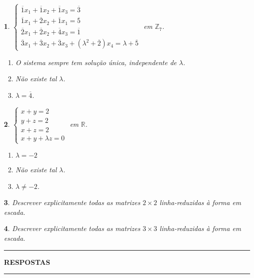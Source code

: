 \documentclass[12pt]{exam}
\newtheorem{exercicio}{}
\newcommand{\integer}{\mathbb{Z}}
\newcommand{\real}{\mathbb{R}}
\begin{document}
\begin{exercicio}
$\begin{cases}
  \overline{1}x_1 + \overline{1}x_2 + \overline{1}x_3 = \overline{3}\\
  \overline{1}x_1 + \overline{2}x_2 + \overline{1}x_1 = \overline{5}\\
  \overline{2}x_1 + \overline{2}x_2 + \overline{4}x_3 = \overline{1}\\
  \overline{3}x_1 + \overline{3}x_2 + \overline{3}x_3 + (\lambda^2 + \overline{2})x_4 = \lambda + \overline{5}
\end{cases}$ em $\integer_7$.
\begin{solucao}
  \begin{enumerate}[label={\alph*})]
    \item O sistema sempre tem solu\c{c}\~ao \'unica, independente de $\lambda$.
    \item N\~ao existe tal $\lambda$.
    \item $\lambda = \overline{4}$.
  \end{enumerate}
\end{solucao}
\end{exercicio}

\begin{exercicio}\label{sistemasfim}
$\begin{cases}
  x + y = 2\\
  y + z = 2\\
  x + z = 2\\
  x + y + \lambda z = 0
\end{cases}$ em $\real$.
\begin{solucao}
  \begin{enumerate}[label={\alph*})]
    \item $\lambda = -2$
    \item N\~ao existe tal $\lambda$.
    \item $\lambda \ne -2$.
  \end{enumerate}
\end{solucao}
\end{exercicio}

\begin{exercicio}
  Descrever explicitamente todas as matrizes $2 \times 2$ linha-reduzidas \`a forma em escada.
\end{exercicio}

\begin{exercicio}
  Descrever explicitamente todas as matrizes $3 \times 3$ linha-reduzidas \`a forma em escada.
\end{exercicio}

\newpage
{}
\hrule
\begin{center}
{\large\bf RESPOSTAS}
\end{center}
\hrule

\end{document}
